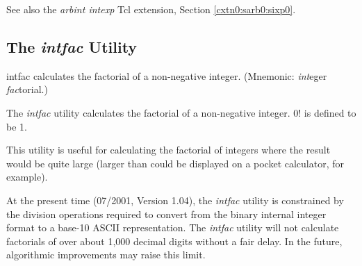 \begin{dosutilcommandseealso}
See also the \emph{arbint intexp} Tcl extension, 
Section \ref{cxtn0:sarb0:sixp0}.
\end{dosutilcommandseealso}

\subsection{The \emph{intfac} Utility}
\label{cdcm0:sali0:sifc0}

\begin{dosutilcommandname}{intfac}%
calculates the factorial of a non-negative
integer.  (Mnemonic:  \emph{int}eger
\emph{fac}torial.)
\end{dosutilcommandname}

\begin{dosutilcommandsynopsis}
\end{dosutilcommandsynopsis}

\begin{dosutilcommanddescription}
The \emph{intfac} utility calculates the factorial of 
a non-negative integer.  0! is defined to be 1.

This utility is useful for calculating the factorial of 
integers where the result would be quite large (larger than
could be displayed on a pocket calculator, for example).
\end{dosutilcommanddescription}

\begin{dosutilcommandremarks}
At the present time (07/2001, Version 1.04), the \emph{intfac} utility
is constrained by the division operations required to convert from the
binary internal integer format to a base-10 ASCII representation.
The \emph{intfac} utility will not calculate factorials of over about
1,000 decimal digits without a fair delay.  In the future, algorithmic
improvements may raise this limit.
\end{dosutilcommandremarks}

